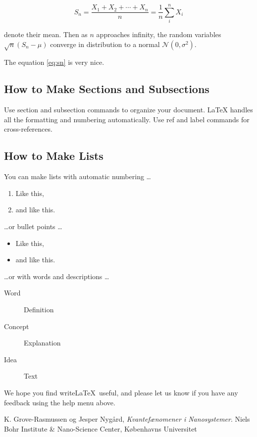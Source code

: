 \documentclass[a4paper]{article}
\begin{document}
\begin{equation}
S_n = \frac{X_1 + X_2 + \cdots + X_n}{n}
      = \frac{1}{n}\sum_{i}^{n} X_i
\label{eq:sn}
\end{equation}

denote their mean. Then as $n$ approaches infinity, the random variables $\sqrt{n}(S_n - \mu)$ converge in distribution to a normal $\mathcal{N}(0, \sigma^2)$.

The equation \ref{eq:sn} is very nice.

\subsection{How to Make Sections and Subsections}

Use section and subsection commands to organize your document. \LaTeX{} handles all the formatting and numbering automatically. Use ref and label commands for cross-references.

\subsection{How to Make Lists}

You can make lists with automatic numbering \dots

\begin{enumerate}
\item Like this,
\item and like this.
\end{enumerate}
\dots or bullet points \dots
\begin{itemize}
\item Like this,
\item and like this.
\end{itemize}
\dots or with words and descriptions \dots
\begin{description}
\item[Word] Definition
\item[Concept] Explanation
\item[Idea] Text
\end{description}

We hope you find write\LaTeX\ useful, and please let us know if you have any feedback using the help menu above.


\begin{thebibliography}{9}
  K. Grove-Rasmussen og Jesper Nygård,
  \emph{Kvantefænomener i Nanosystemer}.
  Niels Bohr Institute \& Nano-Science Center, Københavns Universitet

\end{thebibliography}
\end{document}
